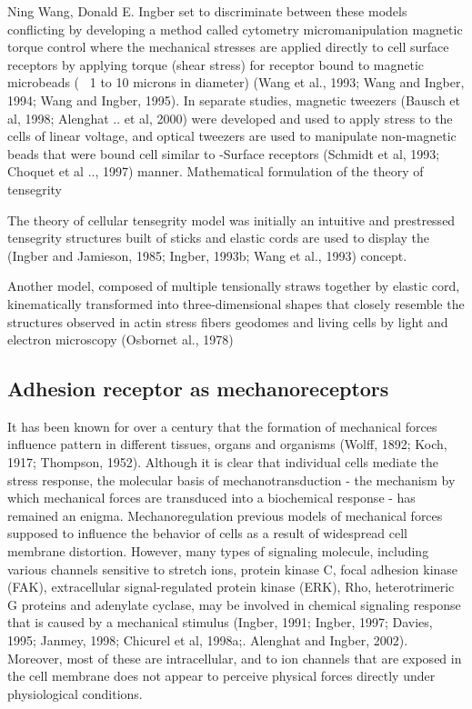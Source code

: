     Ning Wang, Donald E. Ingber set to discriminate between these models conflicting by developing a method called cytometry micromanipulation magnetic torque control where the mechanical stresses are applied directly to cell surface receptors by applying torque (shear stress) for receptor bound to magnetic microbeads (~ 1 to 10 microns in diameter) (Wang et al., 1993; Wang and Ingber, 1994; Wang and Ingber, 1995). In separate studies, magnetic tweezers (Bausch et al, 1998; Alenghat .. et al, 2000) were developed and used to apply stress to the cells of linear voltage, and optical tweezers are used to manipulate non-magnetic beads that were bound cell similar to -Surface receptors (Schmidt et al, 1993; Choquet et al .., 1997) manner.
    Mathematical formulation of the theory of tensegrity

    The theory of cellular tensegrity model was initially an intuitive and prestressed tensegrity structures built of sticks and elastic cords are used to display the (Ingber and Jamieson, 1985; Ingber, 1993b; Wang et al., 1993) concept.

    Another model, composed of multiple tensionally straws together by elastic cord, kinematically transformed into three-dimensional shapes that closely resemble the structures observed in actin stress fibers geodomes and living cells by light and electron microscopy (Osbornet al., 1978)

\subsection{Adhesion receptor as mechanoreceptors}

    It has been known for over a century that the formation of mechanical forces influence pattern in different tissues, organs and organisms (Wolff, 1892; Koch, 1917; Thompson, 1952). Although it is clear that individual cells mediate the stress response, the molecular basis of mechanotransduction - the mechanism by which mechanical forces are transduced into a biochemical response - has remained an enigma. Mechanoregulation previous models of mechanical forces supposed to influence the behavior of cells as a result of widespread cell membrane distortion. However, many types of signaling molecule, including various channels sensitive to stretch ions, protein kinase C, focal adhesion kinase (FAK), extracellular signal-regulated protein kinase (ERK), Rho, heterotrimeric G proteins and adenylate cyclase, may be involved in chemical signaling response that is caused by a mechanical stimulus (Ingber, 1991; Ingber, 1997; Davies, 1995; Janmey, 1998; Chicurel et al, 1998a;. Alenghat and Ingber, 2002). Moreover, most of these are intracellular, and to ion channels that are exposed in the cell membrane does not appear to perceive physical forces directly under physiological conditions.

